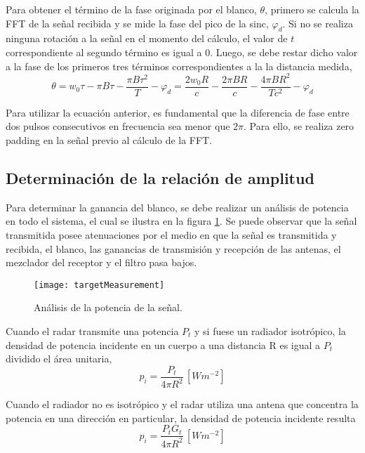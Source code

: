 Para obtener el término de la fase originada por el blanco, $\theta$, primero se calcula la FFT de la señal recibida y se mide la fase del pico de la sinc, $\varphi_d$. Si no se realiza ninguna rotación a la señal en el momento del cálculo, el valor de $t$ correspondiente al segundo término es igual a 0. Luego, se debe restar dicho valor a la fase de los primeros tres términos correspondientes a la la distancia medida, 
\begin{equation}\label{eq:phaseMeasurement}
  \theta =  w_0\tau - \pi B\tau - \dfrac{\pi B\tau^2}{T} - \varphi_d  = \dfrac{2w_0R}{c} - \dfrac{2\pi BR}{c} - \dfrac{4\pi BR^2}{Tc^2} - \varphi_d
\end{equation}

Para utilizar la ecuación anterior, es fundamental que la diferencia de fase entre dos pulsos consecutivos en frecuencia sea menor que $2\pi$. Para ello, se realiza zero padding en la señal previo al cálculo de la FFT.


\subsection{Determinación de la relación de amplitud}

Para determinar la ganancia del blanco, se debe realizar un análisis de potencia en todo el sistema, el cual se ilustra en la figura  \ref{fig:powerAnalysis}. Se puede observar que la señal transmitida posee atenuaciones por el medio en que la señal es transmitida y recibida, el blanco, las ganancias de transmisión y recepción de las antenas, el mezclador del receptor y el filtro pasa bajos. 

\begin{figure}[H]
 \centering
 \texttt{[image: targetMeasurement]}
 \caption{Análisis de la potencia de la señal.}
 \label{fig:powerAnalysis}
\end{figure}

Cuando el radar transmite una potencia $P_t$ y si fuese un radiador isotrópico, la densidad de potencia incidente en un cuerpo a una distancia R es igual a $P_t$ dividido el área unitaria,
\begin{equation}
  p_i = \dfrac{P_t}{4\pi R^2} \,[\si{Wm^{-2}}]
\end{equation}

Cuando el radiador no es isotrópico y el radar utiliza una antena que concentra la potencia en una dirección en particular, la densidad de potencia incidente resulta
\begin{equation}
  p_i = \dfrac{P_tG_t}{4\pi R^2} \,[\si{Wm^{-2}}]
\end{equation}

